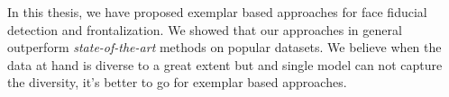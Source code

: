 In this thesis, we have proposed exemplar based approaches for face fiducial detection and frontalization.
We showed that our approaches in general outperform \textit{state-of-the-art} methods on popular datasets.
We believe when the data at hand is diverse to a great extent but and single model can not capture the 
diversity, it's better to go for exemplar based approaches.

